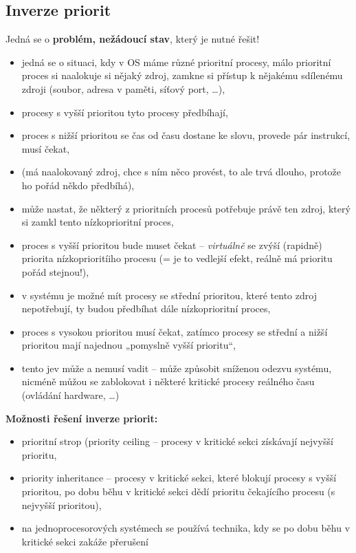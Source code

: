 \documentclass[a4paper, 11pt]{article}
\begin{document}
\subsection{Inverze priorit}
Jedná se o \textbf{problém, nežádoucí stav}, který je nutné řešit!
\begin{itemize}
    \item jedná se o situaci, kdy v OS máme různé prioritní procesy, málo prioritní proces si naalokuje si nějaký zdroj, zamkne si přístup k nějakému sdílenému zdroji (soubor, adresa v paměti, síťový port, \ldots),
    \item procesy s vyšší prioritou tyto procesy předbíhají, 
    \item proces s nižší prioritou se čas od času dostane ke slovu, provede pár instrukcí, musí čekat,
    \item (má naalokovaný zdroj, chce s ním něco provést, to ale trvá dlouho, protože ho pořád někdo předbíhá),
    \item může nastat, že některý z prioritních procesů potřebuje právě ten zdroj, který si zamkl tento nízkoprioritní proces,
    \item proces s vyšší prioritou bude muset čekat -- \emph{virtuálně} se zvýší (rapidně) priorita nízkoprioritíiho procesu (= je to vedlejší efekt, reálně má prioritu pořád stejnou!),
    \item v systému je možné mít procesy se střední prioritou, které tento zdroj nepotřebují, ty budou předbíhat dále nízkoprioritní proces,
    \item proces s vysokou prioritou musí čekat, zatímco procesy se střední a nižší prioritou mají najednou „pomyslně vyšší prioritu“,
    \item tento jev může a nemusí vadit -- může způsobit sníženou odezvu systému, nicméně můžou se zablokovat i některé kritické procesy reálného času (ovládání hardware, \ldots)
\end{itemize}

\textbf{Možnosti řešení inverze priorit:}
\begin{itemize}
    \item prioritní strop (priority ceiling -- procesy v kritické sekci získávají nejvyšší prioritu,
    \item priority inheritance -- procesy v kritické sekci, které blokují procesy s vyšší prioritou, po dobu běhu v kritické sekci dědí prioritu čekajícího procesu (s nejvyšší prioritou),
    \item na jednoprocesorových systémech se používá technika, kdy se po dobu běhu v kritické sekci zakáže přerušení
\end{itemize}
\end{document}
